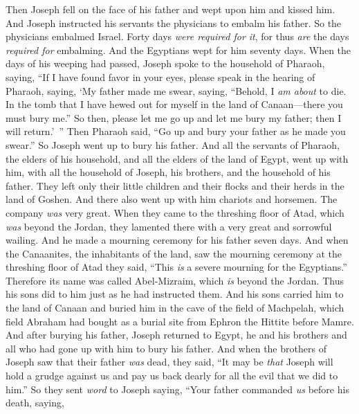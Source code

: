 \begin{biblechapter} %
 Then Joseph fell on the face of his father and wept upon him and kissed him.
\verse And Joseph instructed his servants the physicians to embalm his father. So the physicians embalmed Israel.
\verse Forty days \textit{were required for it}, for thus \textit{are} the days \textit{required for} embalming. And the Egyptians wept for him seventy days.
\verse When the days of his weeping had passed, Joseph spoke to the household of Pharaoh, saying, “If I have found favor in your eyes, please speak in the hearing of Pharaoh, saying,
\verse ‘My father made me swear, saying, “Behold, I \textit{am about} to die. In the tomb that I have hewed out for myself in the land of Canaan—there you must bury me.” So then, please let me go up and let me bury my father; then I will return.’ ”
\verse Then Pharaoh said, “Go up and bury your father as he made you swear.”
\verse So Joseph went up to bury his father. And all the servants of Pharaoh, the elders of his household, and all the elders of the land of Egypt, went up with him,
\verse with all the household of Joseph, his brothers, and the household of his father. They left only their little children and their flocks and their herds in the land of Goshen.
\verse And there also went up with him chariots and horsemen. The company \textit{was} very great.
\verse When they came to the threshing floor of Atad, which \textit{was} beyond the Jordan, they lamented there with a very great and sorrowful wailing. And he made a mourning ceremony for his father seven days.
\verse And when the Canaanites, the inhabitants of the land, saw the mourning ceremony at the threshing floor of Atad they said, “This \textit{is} a severe mourning for the Egyptians.” Therefore its name was called Abel-Mizraim, which \textit{is} beyond the Jordan.
\verse Thus his sons did to him just as he had instructed them.
\verse And his sons carried him to the land of Canaan and buried him in the cave of the field of Machpelah, which field Abraham had bought as a burial site from Ephron the Hittite before Mamre.
\verse And after burying his father, Joseph returned to Egypt, he and his brothers and all who had gone up with him to bury his father.
\verse And when the brothers of Joseph saw that their father \textit{was} dead, they said, “It may be \textit{that} Joseph will hold a grudge against us and pay us back dearly for all the evil that we did to him.”
\verse So they sent \textit{word} to Joseph saying, “Your father commanded \textit{us} before his death, saying,

\end{biblechapter}
